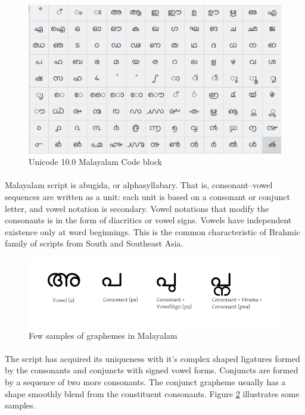 \documentclass[10pt]{article}
\begin{document}
\begin{figure}[h!]
	\centering
	\includegraphics[scale=0.2]{images/unicodeml.png}
	\caption{Unicode 10.0 Malayalam Code block}
	\label{unicode}
\end{figure} 


\paragraph{}
Malayalam script is abugida, or alphasyllabary. That is, consonant–vowel sequences are written as a unit: each unit is based on a consonant or conjunct letter, and vowel notation is secondary. Vowel notations that modify the consonants is in the form of diacritics or vowel signs. Vowels have independent existence only at word beginnings. This is the common characteristic of Brahmic family of scripts from South and Southeast Asia.


\begin{figure}[h!]
	\centering
	\includegraphics[scale=0.4]{images/malayalamExamples.png}
	\caption{Few samples of graphemes in Malayalam}
	\label{malayalamsamples}
\end{figure} 


\paragraph{}
The script has acquired its uniqueness with it's complex shaped ligatures formed by the consonants and conjuncts with signed vowel forms. Conjuncts are formed by a sequence of two more consonants. The conjunct grapheme usually has a shape smoothly blend from the constituent consonants. Figure \ref{malayalamsamples} illustrates some samples.
\end{document}
